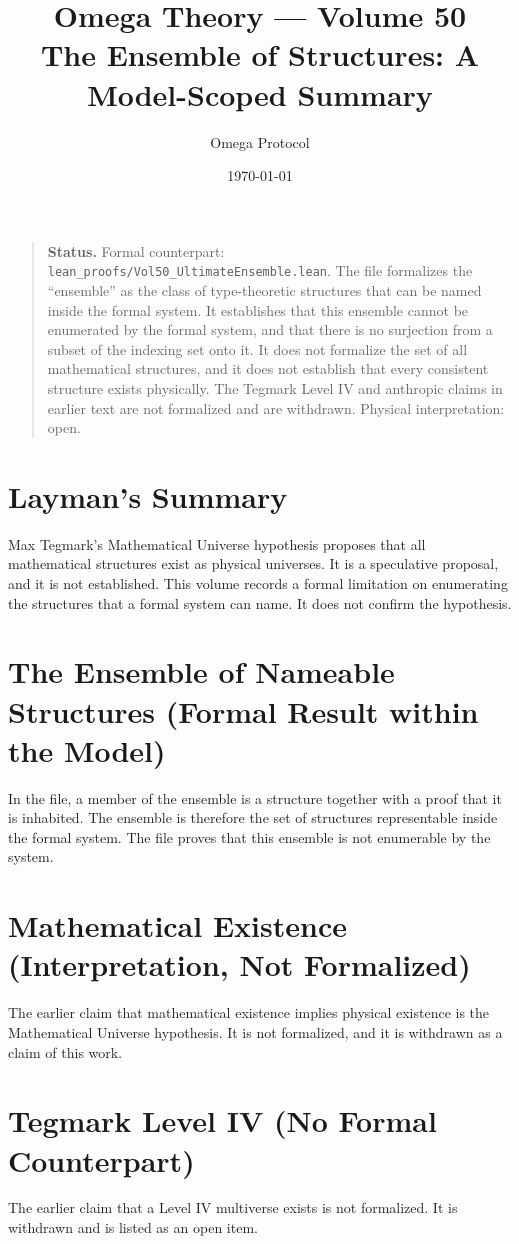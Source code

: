 \documentclass[11pt, a4paper]{article}
\title{Omega Theory --- Volume 50\\\Large The Ensemble of Structures: A Model-Scoped Summary}
\author{Omega Protocol}
\date{\today}
\begin{document}
\maketitle

\begin{quote}
\textbf{Status.} Formal counterpart: \texttt{lean\_proofs/Vol50\_UltimateEnsemble.lean}. The file formalizes the ``ensemble'' as the class of type-theoretic structures that can be named inside the formal system. It establishes that this ensemble cannot be enumerated by the formal system, and that there is no surjection from a subset of the indexing set onto it. It does not formalize the set of all mathematical structures, and it does not establish that every consistent structure exists physically. The Tegmark Level IV and anthropic claims in earlier text are not formalized and are withdrawn. Physical interpretation: open.
\end{quote}

\section*{Layman's Summary}
Max Tegmark's Mathematical Universe hypothesis proposes that all mathematical structures exist as physical universes. It is a speculative proposal, and it is not established. This volume records a formal limitation on enumerating the structures that a formal system can name. It does not confirm the hypothesis.

\section{The Ensemble of Nameable Structures (Formal Result within the Model)}
In the file, a member of the ensemble is a structure together with a proof that it is inhabited. The ensemble is therefore the set of structures representable inside the formal system. The file proves that this ensemble is not enumerable by the system.

\section{Mathematical Existence (Interpretation, Not Formalized)}
The earlier claim that mathematical existence implies physical existence is the Mathematical Universe hypothesis. It is not formalized, and it is withdrawn as a claim of this work.

\section{Tegmark Level IV (No Formal Counterpart)}
The earlier claim that a Level IV multiverse exists is not formalized. It is withdrawn and is listed as an open item.
\end{document}
